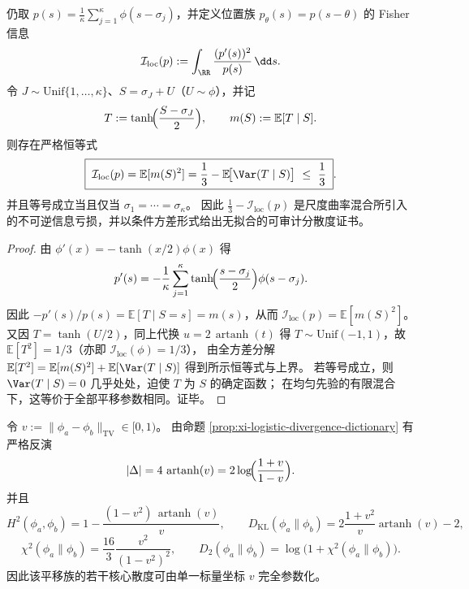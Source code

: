 \begin{proposition}\label{prop:xi-logistic-fisher-information-deficit}
仍取
\(
p(s)=\frac{1}{\kappa}\sum_{j=1}^{\kappa}\phi(s-\sigma_j)
\)，并定义位置族 \(p_\theta(s)=p(s-\theta)\) 的 Fisher 信息
\[
\mathcal I_{\mathrm{loc}}(p):=\int_{\RR}\frac{(p'(s))^{2}}{p(s)}\,\dd s.
\]
令 \(J\sim\mathrm{Unif}\{1,\dots,\kappa\}\)、\(S=\sigma_J+U\)（\(U\sim\phi\)），并记
\[
T:=\tanh\!\Bigl(\frac{S-\sigma_J}{2}\Bigr),
\qquad
m(S):=\mathbb E[T\mid S].
\]
则存在严格恒等式
\[
\boxed{\;
\mathcal I_{\mathrm{loc}}(p)=\mathbb E[m(S)^{2}]
=\frac{1}{3}-\mathbb E\!\bigl[\Var(T\mid S)\bigr]
\ \le\ \frac{1}{3}\; }.
\]
并且等号成立当且仅当 \(\sigma_1=\cdots=\sigma_\kappa\)。
因此 \( \frac{1}{3}-\mathcal I_{\mathrm{loc}}(p)\) 是尺度曲率混合所引入的不可逆信息亏损，并以条件方差形式给出无拟合的可审计分散度证书。
\end{proposition}
\begin{proof}
由 \(\phi'(x)=-\tanh(x/2)\phi(x)\) 得
\[
p'(s)=-\frac{1}{\kappa}\sum_{j=1}^{\kappa}\tanh\!\Bigl(\frac{s-\sigma_j}{2}\Bigr)\phi(s-\sigma_j).
\]
因此
\(
-p'(s)/p(s)=\mathbb E[T\mid S=s]=m(s)
\)，从而
\(
\mathcal I_{\mathrm{loc}}(p)=\mathbb E[m(S)^{2}]
\)。
又因 \(T=\tanh(U/2)\)，同上代换 \(u=2\,\operatorname{artanh}(t)\) 得 \(T\sim\mathrm{Unif}(-1,1)\)，故 \(\mathbb E[T^{2}]=1/3\)（亦即 \(\mathcal I_{\mathrm{loc}}(\phi)=1/3\)），
由全方差分解
\(
\mathbb E[T^{2}]=\mathbb E[m(S)^{2}]+\mathbb E[\Var(T\mid S)]
\)
得到所示恒等式与上界。
若等号成立，则 \(\Var(T\mid S)=0\) 几乎处处，迫使 \(T\) 为 \(S\) 的确定函数；
在均匀先验的有限混合下，这等价于全部平移参数相同。证毕。
\end{proof}

\begin{remark}\label{rem:xi-logistic-tv-coordinate-parametrization}
令 \(v:=\|\phi_a-\phi_b\|_{\mathrm{TV}}\in[0,1)\)。
由命题 \ref{prop:xi-logistic-divergence-dictionary} 有严格反演
\[
|\Delta|=4\,\operatorname{artanh}(v)=2\log\!\Bigl(\frac{1+v}{1-v}\Bigr).
\]
并且
\[
H^{2}(\phi_a,\phi_b)
=1-\frac{(1-v^{2})\,\operatorname{artanh}(v)}{v},
\qquad
D_{\mathrm{KL}}(\phi_a\|\phi_b)
=2\frac{1+v^{2}}{v}\operatorname{artanh}(v)-2,
\]
\[
\chi^{2}(\phi_a\|\phi_b)
=\frac{16}{3}\frac{v^{2}}{(1-v^{2})^{2}},
\qquad
D_{2}(\phi_a\|\phi_b)
=\log\!\bigl(1+\chi^{2}(\phi_a\|\phi_b)\bigr).
\]
因此该平移族的若干核心散度可由单一标量坐标 \(v\) 完全参数化。
\end{remark}

